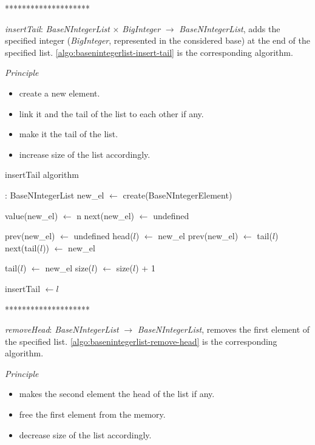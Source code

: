 \documentclass[book, nodocumentinfo]{upmethodology-document}
\newcommand{\separator}{\centerline{********************}}
\begin{document}
\separator

\emph{insertTail}: \emph{BaseNIntegerList} \(×\) \emph{BigInteger} \(\rightarrow\) \emph{BaseNIntegerList},
adds the specified integer (\emph{BigInteger}, represented in the considered base) at the end
of the specified list.
\ref{algo:basenintegerlist-insert-tail} is the corresponding algorithm.

\emph{Principle}
\begin{itemize}
    \item create a new element.
    \item link it and the tail of the list to each other if any.
    \item make it the tail of the list.
    \item increase size of the list accordingly.
\end{itemize}

\begin{algorithm}[H]
    \caption{insertTail algorithm}
    \label{algo:basenintegerlist-insert-tail}

    \begin{algorithmic}
         : BaseNIntegerList
            \State new\_el \(\leftarrow\) create(BaseNIntegerElement)

            \State value(new\_el) \(\leftarrow\) n
            \State next(new\_el) \(\leftarrow\) undefined

                \State prev(new\_el) \(\leftarrow\) undefined
                \State head(\(l\)) \(\leftarrow\) new\_el
            \Else
                \State prev(new\_el) \(\leftarrow\) tail(\(l\))
                \State next(tail(\(l\))) \(\leftarrow\) new\_el
            \EndIf

            \State tail(\(l\)) \(\leftarrow\) new\_el
            \State size(\(l\)) \(\leftarrow\) size(\(l\)) + 1

            \State insertTail \(\leftarrow l\)
        \EndFunction
    \end{algorithmic}
\end{algorithm}

\separator

\emph{removeHead}: \emph{BaseNIntegerList} \(\rightarrow\) \emph{BaseNIntegerList},
removes the first element of the specified list.
\ref{algo:basenintegerlist-remove-head} is the corresponding algorithm.

\emph{Principle}
\begin{itemize}
    \item makes the second element the head of the list if any.
    \item free the first element from the memory.
    \item decrease size of the list accordingly.
\end{itemize}
\end{document}
